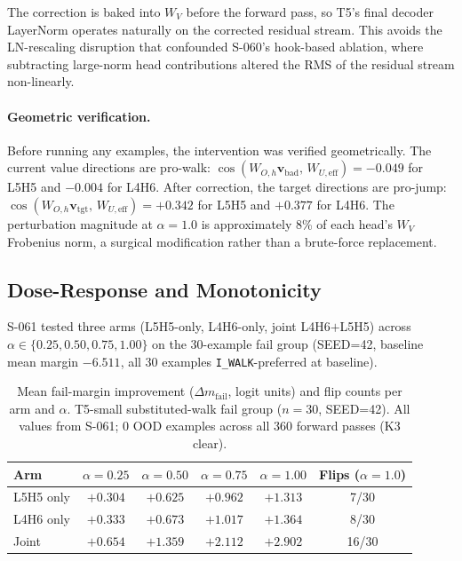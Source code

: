The correction is baked into $W_V$ before the forward pass, so T5's final decoder
LayerNorm operates naturally on the corrected residual stream.
This avoids the LN-rescaling disruption that confounded S-060's hook-based ablation,
where subtracting large-norm head contributions altered the RMS of the residual stream
non-linearly.

\paragraph{Geometric verification.}
Before running any examples, the intervention was verified geometrically.
The current value directions are pro-walk: $\cos(W_{O,h}\mathbf{v}_\text{bad},\,W_{U,\text{eff}})
= -0.049$ for L5H5 and $-0.004$ for L4H6.
After correction, the target directions are pro-jump:
$\cos(W_{O,h}\mathbf{v}_\text{tgt},\,W_{U,\text{eff}}) = +0.342$ for L5H5 and $+0.377$
for L4H6.
The perturbation magnitude at $\alpha=1.0$ is approximately 8\% of each head's
$W_V$ Frobenius norm, a surgical modification rather than a brute-force replacement.

\subsection{Dose-Response and Monotonicity}

S-061 tested three arms (L5H5-only, L4H6-only, joint L4H6$+$L5H5) across
$\alpha\in\{0.25, 0.50, 0.75, 1.00\}$ on the 30-example fail group (SEED=42,
baseline mean margin $-6.511$, all 30 examples \texttt{I\_WALK}-preferred at baseline).

\begin{table}[t]
\centering
\small
\begin{tabular}{lccccc}
\toprule
Arm & $\alpha=0.25$ & $\alpha=0.50$ & $\alpha=0.75$ & $\alpha=1.00$ & Flips ($\alpha=1.0$) \\
\midrule
L5H5 only  & $+0.304$ & $+0.625$ & $+0.962$ & $+1.313$ & 7/30 \\
L4H6 only  & $+0.333$ & $+0.673$ & $+1.017$ & $+1.364$ & 8/30 \\
Joint      & $+0.654$ & $+1.359$ & $+2.112$ & $+2.902$ & 16/30 \\
\bottomrule
\end{tabular}
\caption{Mean fail-margin improvement ($\Delta m_\text{fail}$, logit units) and flip counts
per arm and $\alpha$. T5-small substituted-walk fail group ($n=30$, SEED=42).
All values from S-061; 0 OOD examples across all 360 forward passes (K3 clear).}
\label{tab:dose-response}
\end{table}


